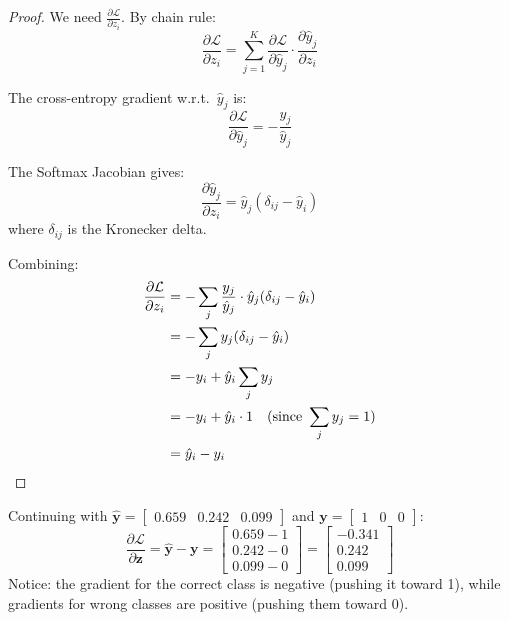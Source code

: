 \documentclass[12pt, a4paper]{report}
\theoremstyle{definition}
\begin{document}
\begin{proof}
We need $\frac{\partial \mathcal{L}}{\partial z_i}$. By chain rule:
\[
\frac{\partial \mathcal{L}}{\partial z_i} = \sum_{j=1}^{K} \frac{\partial \mathcal{L}}{\partial \hat{y}_j} \cdot \frac{\partial \hat{y}_j}{\partial z_i}
\]

The cross-entropy gradient w.r.t.\ $\hat{y}_j$ is:
\[
\frac{\partial \mathcal{L}}{\partial \hat{y}_j} = -\frac{y_j}{\hat{y}_j}
\]

The Softmax Jacobian gives:
\[
\frac{\partial \hat{y}_j}{\partial z_i} = \hat{y}_j(\delta_{ij} - \hat{y}_i)
\]
where $\delta_{ij}$ is the Kronecker delta.

Combining:
\begin{align*}
\frac{\partial \mathcal{L}}{\partial z_i} &= -\sum_{j} \frac{y_j}{\hat{y}_j} \cdot \hat{y}_j(\delta_{ij} - \hat{y}_i) \\
&= -\sum_{j} y_j (\delta_{ij} - \hat{y}_i) \\
&= -y_i + \hat{y}_i \sum_{j} y_j \\
&= -y_i + \hat{y}_i \cdot 1 \quad (\text{since } \sum_j y_j = 1) \\
&= \hat{y}_i - y_i \qedhere
\end{align*}
\end{proof}

\begin{numexample}
Continuing with $\hat{\mathbf{y}} = \begin{bmatrix} 0.659 & 0.242 & 0.099 \end{bmatrix}$ and $\mathbf{y} = \begin{bmatrix} 1 & 0 & 0 \end{bmatrix}$:
\[
\frac{\partial \mathcal{L}}{\partial \mathbf{z}} = \hat{\mathbf{y}} - \mathbf{y} = \begin{bmatrix} 0.659 - 1 \\ 0.242 - 0 \\ 0.099 - 0 \end{bmatrix} = \boxed{\begin{bmatrix} -0.341 \\ 0.242 \\ 0.099 \end{bmatrix}}
\]
Notice: the gradient for the correct class is negative (pushing it toward 1), while gradients for wrong classes are positive (pushing them toward 0).
\end{numexample}


\end{document}
